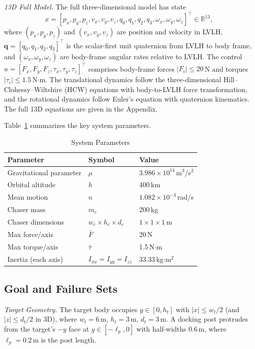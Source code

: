 \documentclass[letterpaper, 10 pt, conference]{ieeeconf}
\begin{document}
\textit{13D Full Model.}
The full three-dimensional model has state
\begin{equation}\label{eq:state13d}
x = [p_x, p_y, p_z, v_x, v_y, v_z, q_0, q_1, q_2, q_3, \omega_x, \omega_y, \omega_z]^\top \!\in\! \mathbb{R}^{13}\!,
\end{equation}
where $(p_x, p_y, p_z)$ and $(v_x, v_y, v_z)$ are position and velocity in LVLH, $\mathbf{q} = [q_0, q_1, q_2, q_3]^\top$ is the scalar-first unit quaternion from LVLH to body frame, and $(\omega_x, \omega_y, \omega_z)$ are body-frame angular rates relative to LVLH. The control $u = [F_x, F_y, F_z, \tau_x, \tau_y, \tau_z]^\top$ comprises body-frame forces $|F_i| \leq 20$\,N and torques $|\tau_i| \leq 1.5$\,N$\cdot$m. The translational dynamics follow the three-dimensional Hill--Clohessy--Wiltshire (HCW) equations with body-to-LVLH force transformation, and the rotational dynamics follow Euler's equation with quaternion kinematics. The full 13D equations are given in the Appendix.

Table~\ref{tab:params} summarizes the key system parameters.

\begin{table}[t]
\caption{System Parameters}
\label{tab:params}
\centering
\begin{tabular}{lll}
\toprule
Parameter & Symbol & Value \\
\midrule
Gravitational parameter & $\mu$ & $3.986\times10^{14}$\,m$^3$/s$^2$ \\
Orbital altitude & $h$ & 400\,km \\
Mean motion & $n$ & $1.082\times10^{-3}$\,rad/s \\
Chaser mass & $m_c$ & 200\,kg \\
Chaser dimensions & $w_c\!\times\!h_c\!\times\!d_c$ & $1\!\times\!1\!\times\!1$\,m \\
Max force/axis & $\bar{F}$ & 20\,N \\
Max torque/axis & $\bar{\tau}$ & 1.5\,N$\cdot$m \\
Inertia (each axis) & $I_{xx}\!=\!I_{yy}\!=\!I_{zz}$ & 33.33\,kg$\cdot$m$^2$ \\
\bottomrule
\end{tabular}
\end{table}

\subsection{Goal and Failure Sets}

\textit{Target Geometry.}
The target body occupies $y \in [0, h_t]$ with $|x| \leq w_t/2$ (and $|z| \leq d_t/2$ in 3D), where $w_t = 6$\,m, $h_t = 3$\,m, $d_t = 3$\,m. A docking post protrudes from the target's $-y$ face at $y \in [-\ell_p, 0]$ with half-widths $0.6$\,m, where $\ell_p = 0.2$\,m is the post length.
\end{document}
